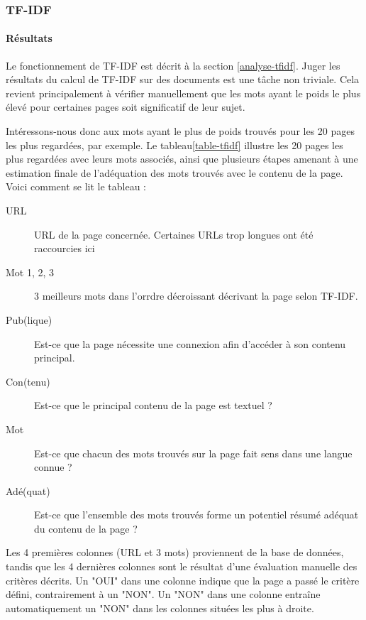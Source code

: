 		\subsubsection{TF-IDF}

			\paragraph{Résultats}

				Le fonctionnement de TF-IDF est décrit à la section \ref{analyse-tfidf}. Juger les résultats du calcul de TF-IDF sur des documents est une tâche non triviale. Cela revient principalement à vérifier manuellement que les mots ayant le poids le plus élevé pour certaines pages soit significatif de leur sujet.

				Intéressons-nous donc aux mots ayant le plus de poids trouvés pour les 20 pages les plus regardées, par exemple. Le tableau\ref{table-tfidf} illustre les 20 pages les plus regardées avec leurs mots associés, ainsi que plusieurs étapes amenant à une estimation finale de l'adéquation des mots trouvés avec le contenu de la page. Voici comment se lit le tableau :
				\begin{description}
					\item[URL] URL de la page concernée. Certaines URLs trop longues ont été raccourcies ici
					\item[Mot 1, 2, 3] 3 meilleurs mots dans l'orrdre décroissant décrivant la page selon TF-IDF.
					\item[Pub(lique)] Est-ce que la page nécessite une connexion afin d'accéder à son contenu principal.
					\item[Con(tenu)] Est-ce que le principal contenu de la page est textuel ?
					\item[Mot] Est-ce que chacun des mots trouvés sur la page fait sens dans une langue connue ?
					\item[Adé(quat)] Est-ce que l'ensemble des mots trouvés forme un potentiel résumé adéquat du contenu de la page ?
				\end{description}

				Les 4 premières colonnes (URL et 3 mots) proviennent de la base de données, tandis que les 4 dernières colonnes sont le résultat d'une évaluation manuelle des critères décrits. Un "OUI" dans une colonne indique que la page a passé le critère défini, contrairement à un "NON". Un "NON" dans une colonne entraîne automatiquement un "NON" dans les colonnes situées les plus à droite.

